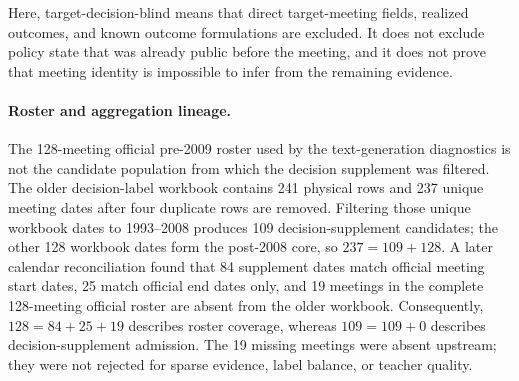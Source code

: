 Here, target-decision-blind means that direct target-meeting fields, realized
outcomes, and known outcome formulations are excluded. It does not exclude
policy state that was already public before the meeting, and it does not prove
that meeting identity is impossible to infer from the remaining evidence.

\paragraph*{Roster and aggregation lineage.}

The 128-meeting official pre-2009 roster used by the text-generation
diagnostics is not the candidate population from which the decision supplement
was filtered. The older decision-label workbook contains 241 physical rows and
237 unique meeting dates after four duplicate rows are removed. Filtering
those unique workbook dates to 1993--2008 produces 109 decision-supplement
candidates; the other 128 workbook dates form the post-2008 core, so
$237=109+128$. A later calendar reconciliation found that 84 supplement dates
match official meeting
start dates, 25 match official end dates only, and 19 meetings in the complete
128-meeting official roster are absent from the older workbook. Consequently,
$128=84+25+19$ describes roster coverage, whereas
$109=109+0$ describes decision-supplement admission. The 19 missing meetings
were absent upstream; they were not rejected for sparse evidence, label
balance, or teacher quality.

